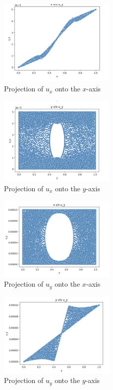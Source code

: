 \documentclass[fleqn,10pt]{olplainarticle}
\begin{document}
\begin{figure}[h!]
\centering
\includegraphics[width=0.5\textwidth]{Photo/3.png}
\caption{Projection of $u_x$ onto the $x$-axis}
\end{figure}

\begin{figure}[h!]
\centering
\includegraphics[width=0.5\textwidth]{Photo/4.png}
\caption{Projection of $u_x$ onto the $y$-axis}
\end{figure}

\begin{figure}[h!]
\centering
\includegraphics[width=0.5\textwidth]{Photo/5.png}
\caption{Projection of $u_y$ onto the $x$-axis}
\end{figure}

\begin{figure}[h!]
\centering
\includegraphics[width=0.5\textwidth]{Photo/6.png}
\caption{Projection of $u_y$ onto the $y$-axis}
\end{figure}
\end{document}
